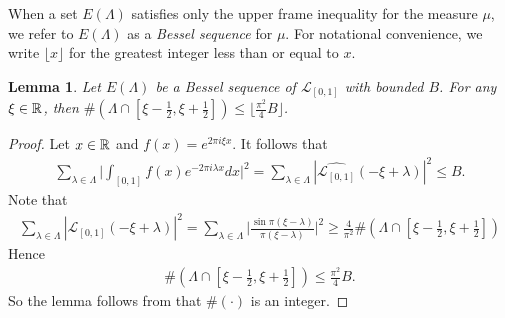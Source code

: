\documentclass[12pt,psfig,reqno]{amsart}
\numberwithin{equation}{section}
\theoremstyle{plain}
\newtheorem{lem}[thm]{Lemma}
\begin{document}
When a set $E(\Lambda)$ satisfies only the upper frame inequality for the measure $\mu$, we refer to $E(\Lambda)$ as a \textit{Bessel sequence} for $\mu$. For notational convenience, we write $\lfloor x \rfloor$ for the greatest integer less than or equal to $x$.
\begin{lem}\label{thm3.1}
Let $E(\Lambda)$ be a Bessel sequence of $\mathcal{L}_{[0,1]}$ with  bounded $B$. 
For any $\xi\in\Bbb R$, then $\#(\Lambda\cap[\xi-\frac12,\xi+\frac12])\leq \lfloor \frac{\pi^2}{4}B \rfloor$. 
\end{lem}
\begin{proof}
	Let $x\in\Bbb R$ and $f(x)=e^{2\pi i\xi x}$.  
	It follows that 
	\begin{align*}
		\sum_{\lambda\in\Lambda}\Big|\int_{[0,1]}f(x)e^{-2\pi i\lambda x}dx\Big|^2=\sum_{\lambda\in\Lambda}|\widehat{\mathcal{L}_{[0,1]}}(-\xi+\lambda)|^2\leq B.
	\end{align*}
	Note that \begin{align*}
		\sum_{\lambda\in\Lambda}|\widehat{\mathcal{L}_{[0,1]}}(-\xi+\lambda)|^2=		\sum_{\lambda\in\Lambda}\Big|\frac{\sin\pi(\xi-\lambda)}{\pi(\xi-\lambda)}\Big|^2\geq \frac{4}{\pi^2}\#(\Lambda\cap[\xi-\frac12,\xi+\frac12])
	\end{align*}
	Hence 
	\begin{align*}
	\#(\Lambda\cap[\xi-\frac12,\xi+\frac12])\leq \frac{\pi^2}{4}B. 	
	\end{align*}
	So the lemma follows from that $\#(\cdot)$ is an integer. 
\end{proof}
\end{document}
